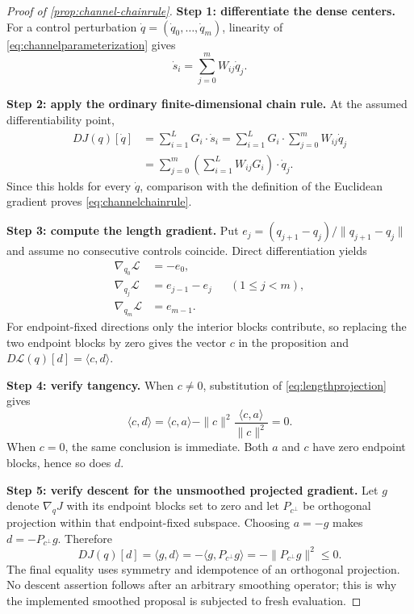 \begin{proof}[Proof of \cref{prop:channel-chainrule}]
\textbf{Step 1: differentiate the dense centers.}
For a control perturbation $\dot q=(\dot q_0,\ldots,\dot q_m)$,
linearity of \cref{eq:channelparameterization} gives
\begin{equation}
 \dot s_i=\sum_{j=0}^{m}W_{ij}\dot q_j.
 \label{eq:densecenterdifferential}
\end{equation}

\textbf{Step 2: apply the ordinary finite-dimensional chain rule.}
At the assumed differentiability point,
\begin{align}
 DJ(q)[\dot q]
 &=\sum_{i=1}^{L}G_i\cdot\dot s_i
 =\sum_{i=1}^{L}G_i\cdot
   \sum_{j=0}^{m}W_{ij}\dot q_j\\
 &=\sum_{j=0}^{m}
   \left(\sum_{i=1}^{L}W_{ij}G_i\right)\cdot\dot q_j.
 \label{eq:channelchainproof}
\end{align}
Since this holds for every $\dot q$, comparison with the definition of the
Euclidean gradient proves \cref{eq:channelchainrule}.

\textbf{Step 3: compute the length gradient.}
Put
$e_j=(q_{j+1}-q_j)/\|q_{j+1}-q_j\|$ and assume no consecutive controls
coincide.  Direct differentiation yields
\begin{equation}
 \begin{aligned}
  \nabla_{q_0}\mathcal L&=-e_0,\\
  \nabla_{q_j}\mathcal L&=e_{j-1}-e_j &&(1\le j<m),\\
  \nabla_{q_m}\mathcal L&=e_{m-1}.
 \end{aligned}
 \label{eq:lengthgradientexplicit}
\end{equation}
For endpoint-fixed directions only the interior blocks contribute, so replacing
the two endpoint blocks by zero gives the vector $c$ in the proposition and
$D\mathcal L(q)[d]=\langle c,d\rangle$.

\textbf{Step 4: verify tangency.}
When $c\ne0$, substitution of \cref{eq:lengthprojection} gives
\begin{equation}
 \langle c,d\rangle
 =\langle c,a\rangle
  -\|c\|^2\frac{\langle c,a\rangle}{\|c\|^2}=0.
\end{equation}
When $c=0$, the same conclusion is immediate.  Both $a$ and $c$ have zero
endpoint blocks, hence so does $d$.

\textbf{Step 5: verify descent for the unsmoothed projected gradient.}
Let $g$ denote $\nabla_qJ$ with its endpoint blocks set to zero and let
$P_{c^\perp}$ be orthogonal projection within that endpoint-fixed subspace.
Choosing $a=-g$ makes $d=-P_{c^\perp}g$.  Therefore
\begin{equation}
 DJ(q)[d]=\langle g,d\rangle
 =-\langle g,P_{c^\perp}g\rangle
 =-\|P_{c^\perp}g\|^2\le0.
\end{equation}
The final equality uses symmetry and idempotence of an orthogonal projection.
No descent assertion follows after an arbitrary smoothing operator; this is
why the implemented smoothed proposal is subjected to fresh evaluation.
\end{proof}

